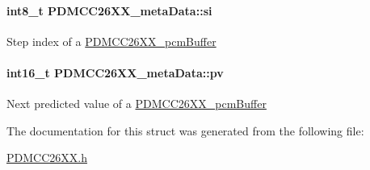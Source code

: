 \paragraph[{si}]{\setlength{\rightskip}{0pt plus 5cm}int8\+\_\+t P\+D\+M\+C\+C26\+X\+X\+\_\+meta\+Data\+::si}\label{struct_p_d_m_c_c26_x_x__meta_data_a817f693899137c53178f402eb5cbc459}
Step index of a \hyperlink{struct_p_d_m_c_c26_x_x__pcm_buffer}{P\+D\+M\+C\+C26\+X\+X\+\_\+pcm\+Buffer} 
\paragraph[{pv}]{\setlength{\rightskip}{0pt plus 5cm}int16\+\_\+t P\+D\+M\+C\+C26\+X\+X\+\_\+meta\+Data\+::pv}\label{struct_p_d_m_c_c26_x_x__meta_data_a3c221557847398149d1034d3d2a590b2}
Next predicted value of a \hyperlink{struct_p_d_m_c_c26_x_x__pcm_buffer}{P\+D\+M\+C\+C26\+X\+X\+\_\+pcm\+Buffer} 

The documentation for this struct was generated from the following file\+:\begin{DoxyCompactItemize}
\item 
\hyperlink{_p_d_m_c_c26_x_x_8h}{P\+D\+M\+C\+C26\+X\+X.\+h}\end{DoxyCompactItemize}
